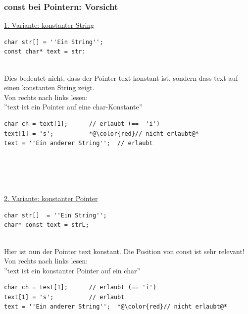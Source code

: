\subsubsection{const bei Pointern: Vorsicht}
\label{sec:const bei Pointern: Vorsicht}
\underline{1. Variante: konstanter String}\\
\noindent
\begin{minipage}{\linewidth}
\begin{lstlisting}
char str[] = ''Ein String'';
const char* text = str:
\end{lstlisting}
\end{minipage}
\\
Dies bedeutet nicht, dass der Pointer text konstant ist, sondern dass text auf einen konstanten String zeigt.\\
Von rechts nach links lesen:\\ ''text ist ein Pointer auf eine char-Konstante''\\
\noindent
\begin{minipage}{\linewidth}
\begin{lstlisting}
char ch = text[1];		// erlaubt (==  'i')
text[1] = 's';			*@\color{red}// nicht erlaubt@*
text = ''Ein anderer String'';	// erlaubt
\end{lstlisting}
\end{minipage}
\\ \\ \\ \\
\underline{2. Variante: konstanter Pointer}\\
\noindent
\begin{minipage}{\linewidth}
\begin{lstlisting}
char str[]  = ''Ein String'';
char* const text = strL;
\end{lstlisting}
\end{minipage}
\\
Hier ist nun der Pointer text konstant. Die Position von const ist sehr relevant!\\
Von rechts nach links lesen:\\ ''text ist ein konstanter Pointer auf ein char''\\
\noindent
\begin{minipage}{\linewidth}
\begin{lstlisting}
char ch = test[1];		// erlaubt (== 'i')
text[1] = 's';			// erlaubt
text = ''Ein anderer String'';	*@\color{red}// nicht erlaubt@*
\end{lstlisting}
\end{minipage}
